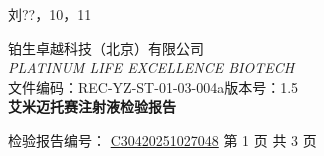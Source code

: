 \documentclass[UTF8,10pt,a4paper,fontset=fandol]{ctexart}
\newcommand{\fieldvalue}[1]{#1}
\newcommand{\handwritten}[1]{#1}
\begin{document}
\handwritten{刘??，10，11}

\newpage

\begin{center}
{\small
铂生卓越科技（北京）有限公司\\
\textit{PLATINUM LIFE EXCELLENCE BIOTECH}\\[2mm]
文件编码：REC-YZ-ST-01-03-004a\qquad 版本号：1.5\\[2mm]
{\large\textbf{艾米迈托赛注射液检验报告}}
}
\end{center}

\noindent
检验报告编号：
\fieldvalue{\underline{C30420251027048}}
\quad 第 1 页 共 3 页

\vspace{2mm}
\end{document}

